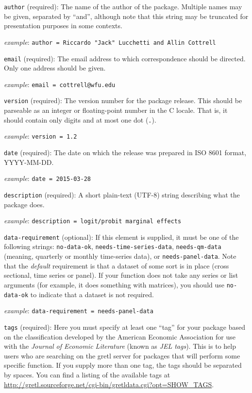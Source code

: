 \documentclass[oneside]{book}
\newcommand{\ttusage}[1]{\textit{example}: \quad \texttt{#1}}
\newcommand{\vbusage}[0]{\textit{example}: \quad}
\begin{document}
\begin{description}

\item \texttt{author} (required): The name of the author of the
  package. Multiple names may be given, separated by ``and'', although
  note that this string may be truncated for presentation purposes in
  some contexts.

  \vbusage{} \verb|author = Riccardo "Jack" Lucchetti and Allin Cottrell|

\item \texttt{email} (required): The email address to which
  correspondence should be directed. Only one address should be given.

  \vbusage{} \verb|email = cottrell@wfu.edu|

\item \texttt{version} (required): The version number for the package
  release. This should be parseable as an integer or floating-point
  number in the \textsf{C} locale. That is, it should contain only
  digits and at most one dot (\texttt{.}).

  \ttusage{version = 1.2}

\item \texttt{date} (required): The date on which the release was
  prepared in ISO 8601 format, \textsf{YYYY-MM-DD}.

  \ttusage{date = 2015-03-28}

\item \texttt{description} (required): A short plain-text (UTF-8)
  string describing what the package does.

  \ttusage{description = logit/probit marginal effects}

\item \texttt{data-requirement} (optional): If this element is
  supplied, it must be one of the following strings:
  \texttt{no-data-ok}, \texttt{needs-time-series-data},
  \texttt{needs-qm-data} (meaning, quarterly or monthly time-series
  data), or \texttt{needs-panel-data}. Note that the \textit{default}
  requirement is that a dataset of some sort is in place (cross
  sectional, time series or panel). If your function does not take any
  series or list arguments (for example, it does something with
  matrices), you should use \texttt{no-data-ok} to indicate that a
  dataset is not required.

  \ttusage{data-requirement = needs-panel-data}

\item \texttt{tags} (required): Here you must specify at least one
  ``tag'' for your package based on the classification developed by
  the American Economic Association for use with the \textit{Journal
    of Economic Literature} (known as \textit{JEL tags}). This is
  to help users who are searching on the gretl server for packages
  that will perform some specific function. If you supply more than
  one tag, the tags should be separated by spaces. You can find a
  listing of the available tags at
  \url{http://gretl.sourceforge.net/cgi-bin/gretldata.cgi?opt=SHOW_TAGS}.


\end{description}
\end{document}
